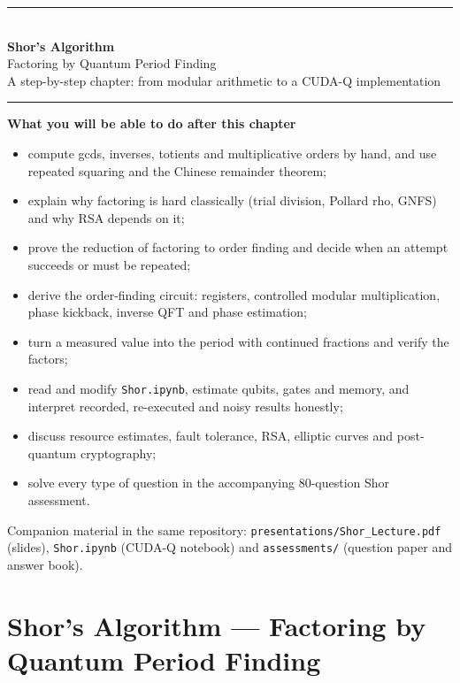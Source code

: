 \documentclass[11pt,a4paper,openany]{book}
\begin{document}
\begin{titlepage}
\centering
{\color{brand}\rule{\linewidth}{1.5pt}}\\[10pt]
{\Huge\bfseries\color{brand} Shor's Algorithm}\\[8pt]
{\LARGE Factoring by Quantum Period Finding}\\[6pt]
{\large A step-by-step chapter: from modular arithmetic to a CUDA-Q implementation}\\[6pt]
{\color{brand}\rule{\linewidth}{1.5pt}}
\vspace{18mm}

\begin{minipage}{0.86\linewidth}
\large
\textbf{What you will be able to do after this chapter}
\begin{itemize}[itemsep=3pt]
\item compute gcds, inverses, totients and multiplicative orders by hand, and use repeated squaring and the Chinese remainder theorem;
\item explain why factoring is hard classically (trial division, Pollard rho, GNFS) and why RSA depends on it;
\item prove the reduction of factoring to order finding and decide when an attempt succeeds or must be repeated;
\item derive the order-finding circuit: registers, controlled modular multiplication, phase kickback, inverse QFT and phase estimation;
\item turn a measured value into the period with continued fractions and verify the factors;
\item read and modify \texttt{Shor.ipynb}, estimate qubits, gates and memory, and interpret recorded, re-executed and noisy results honestly;
\item discuss resource estimates, fault tolerance, RSA, elliptic curves and post-quantum cryptography;
\item solve every type of question in the accompanying 80-question Shor assessment.
\end{itemize}
\end{minipage}
\vfill
{\small Companion material in the same repository: \texttt{presentations/Shor\_Lecture.pdf} (slides),
\texttt{Shor.ipynb} (CUDA-Q notebook) and \texttt{assessments/} (question paper and answer book).}
\end{titlepage}

\tableofcontents
\setcounter{chapter}{0}
\chapter*{Shor's Algorithm --- Factoring by Quantum Period Finding}
\end{document}
